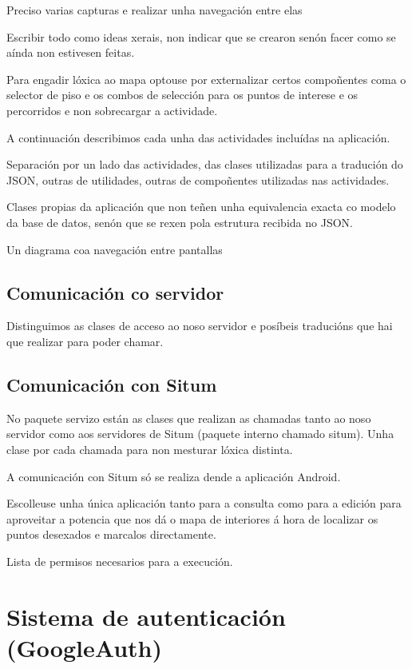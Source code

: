 Preciso varias capturas e realizar unha navegación entre elas

Escribir todo como ideas xerais, non indicar que se crearon senón facer como se aínda non estivesen feitas.



Para engadir lóxica ao mapa optouse por externalizar certos compoñentes coma o selector de piso e os combos de selección para os puntos de interese e os percorridos e non sobrecargar a actividade.

A continuación describimos cada unha das actividades incluídas na aplicación.

Separación por un lado das actividades, das clases utilizadas para a tradución do JSON, outras de utilidades, outras de compoñentes utilizadas nas actividades.



Clases propias da aplicación que non teñen unha equivalencia exacta co modelo da base de datos, senón que se rexen pola estrutura recibida no JSON.



Un diagrama coa navegación entre pantallas


\subsection{Comunicación co servidor}
Distinguimos as clases de acceso ao noso servidor e posíbeis traducións que hai que realizar para poder chamar.


\subsection{Comunicación con Situm}
No paquete servizo están as clases que realizan as chamadas tanto ao noso servidor como aos servidores de Situm (paquete interno chamado situm). Unha clase por cada chamada para non mesturar lóxica distinta.

A comunicación con Situm só se realiza dende a aplicación Android.

Escolleuse unha única aplicación tanto para a consulta como para a edición para aproveitar a potencia que nos dá o mapa de interiores á hora de localizar os puntos desexados e marcalos directamente.


Lista de permisos necesarios para a execución.


\section{Sistema de autenticación (GoogleAuth)}
